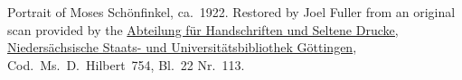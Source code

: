 Portrait of Moses Sch\"onfinkel, ca.~1922. Restored by Joel Fuller
from an original scan provided by the
\href{http://www.sub.uni-goettingen.de/en/contact/departments-a-z/departmental-and-unit-details/abteilunggruppe/handschriften-und-seltene-drucke/}{Abteilung
f\"ur Handschriften und Seltene Drucke, Nieders\"achsische Staats- und
Universit\"atsbibliothek G\"ottingen}, Cod.\ Ms.\ D.~Hilbert~754,
Bl.~22 Nr.~113.

